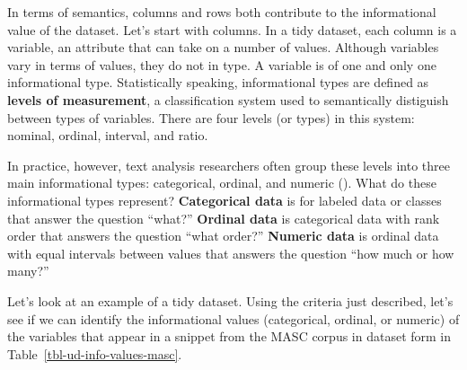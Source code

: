 \documentclass[
  letterpaper,
]{latex/krantz}
\theoremstyle{definition}
\theoremstyle{remark}
\begin{document}
In terms of semantics, columns and rows both contribute to the
informational value of the dataset. Let's start with columns. In a tidy
dataset, each column is a variable, an attribute that can take on a
number of values. Although variables vary in terms of values, they do
not in type. A variable is of one and only one informational type.
Statistically speaking, informational types are defined as
\textbf{levels of measurement}, a classification system used to
semantically distiguish between types of variables. There are four
levels (or types) in this system: nominal, ordinal, interval, and ratio.

In practice, however, text analysis researchers often group these levels
into three main informational types: categorical, ordinal, and numeric
(). What do these
informational types represent? \textbf{Categorical data} is for labeled
data or classes that answer the question ``what?'' \textbf{Ordinal data}
is categorical data with rank order that answers the question ``what
order?'' \textbf{Numeric data} is ordinal data with equal intervals
between values that answers the question ``how much or how many?''

Let's look at an example of a tidy dataset. Using the criteria just
described, let's see if we can identify the informational values
(categorical, ordinal, or numeric) of the variables that appear in a
snippet from the MASC corpus in dataset form in
Table~\ref{tbl-ud-info-values-masc}.
\end{document}
